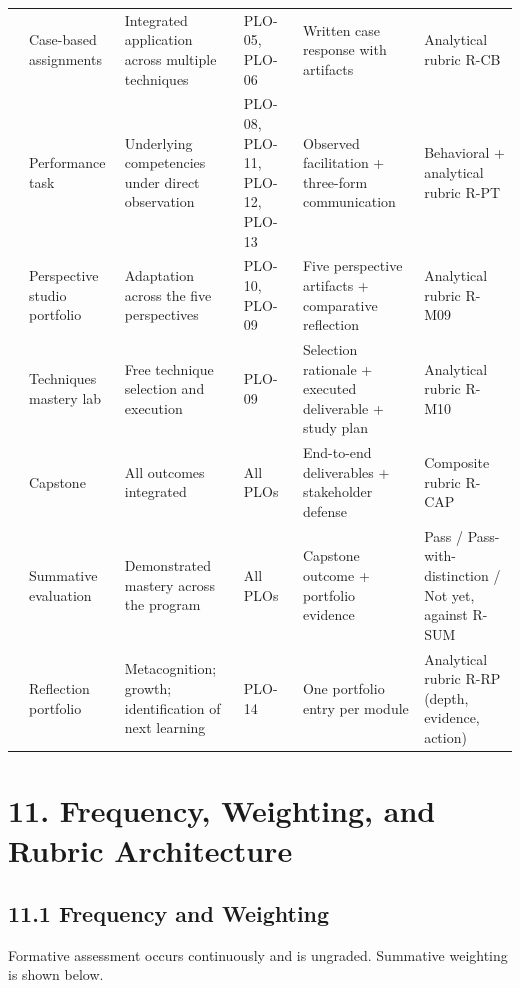\documentclass[11pt,letterpaper,oneside]{report}
\begin{document}
\begin{landscape}
\begin{longtable}{@{}R{2.55cm} R{2.30cm} R{3.40cm} R{2.55cm} R{4.30cm} R{3.50cm}@{}}
  & Case-based assignments
  & Integrated application across multiple techniques
  & PLO-05, PLO-06
  & Written case response with artifacts
  & Analytical rubric R-CB \\

  & Performance task
  & Underlying competencies under direct observation
  & PLO-08, PLO-11, PLO-12, PLO-13
  & Observed facilitation + three-form communication
  & Behavioral + analytical rubric R-PT \\

  & Perspective studio portfolio
  & Adaptation across the five perspectives
  & PLO-10, PLO-09
  & Five perspective artifacts + comparative reflection
  & Analytical rubric R-M09 \\

  & Techniques mastery lab
  & Free technique selection and execution
  & PLO-09
  & Selection rationale + executed deliverable + study plan
  & Analytical rubric R-M10 \\

  & Capstone
  & All outcomes integrated
  & All PLOs
  & End-to-end deliverables + stakeholder defense
  & Composite rubric R-CAP \\

  & Summative evaluation
  & Demonstrated mastery across the program
  & All PLOs
  & Capstone outcome + portfolio evidence
  & Pass / Pass-with-distinction / Not yet, against R-SUM \\

  & Reflection portfolio
  & Metacognition; growth; identification of next learning
  & PLO-14
  & One portfolio entry per module
  & Analytical rubric R-RP (depth, evidence, action) \\

\end{longtable}
\end{landscape}

\section*{11. Frequency, Weighting, and Rubric Architecture}

\subsection*{11.1 Frequency and Weighting}
Formative assessment occurs continuously and is ungraded. Summative weighting is shown below.
\end{document}
